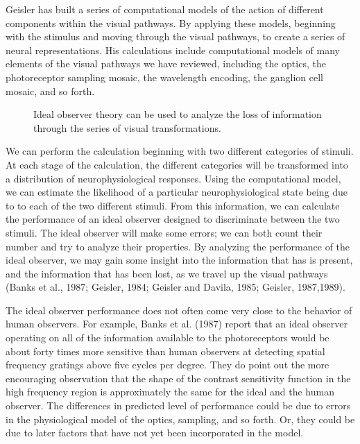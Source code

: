 Geisler has built a series of computational models
of the action of different components within the visual pathways.
By applying these models,
beginning with the stimulus
and moving through the
visual pathways,
to create a series of neural representations.
His calculations include computational
models of many elements of the visual pathways we have reviewed,
including the optics, the photoreceptor sampling mosaic,
the wavelength encoding, the ganglion cell mosaic, and so forth.
\begin{figure}
\centerline{
}
\caption[Ideal Observer Analysis of Behavior]{
Ideal observer theory can be used
to analyze the loss of information
through the series of visual transformations.
}
\label{f11:idealObserver}
\end{figure}

We can perform the calculation
beginning with two different categories of stimuli.
At each stage of the calculation,
the different categories will be transformed into
a distribution of neurophysiological responses.
Using the computational model, we can 
estimate the likelihood of a particular
neurophysiological state being due to
to each of the two different stimuli.
From this information,
we can calculate the performance of an ideal observer
designed to discriminate between the two stimuli.
The ideal observer will make some errors;
we can both count their number and try
to analyze their properties.
By analyzing the performance of the ideal observer,
we may gain some insight into the information that
has is present, and the information that
has been lost, as we travel up the visual pathways
(Banks et al., 1987;  Geisler, 1984; 
Geisler and Davila, 1985; Geisler, 1987,1989).

The ideal observer performance does not often
come very close to the behavior of human observers.
For example, Banks et al. (1987)
report that an ideal observer
operating on all of the information available
to the photoreceptors would be about forty times
more sensitive than human observers at detecting spatial
frequency gratings above five cycles per degree.
They do point out the more encouraging observation
that the shape of the contrast sensitivity
function in the high frequency region
is approximately the same for the ideal and the human observer.
The differences in predicted level of performance
could be due to errors in the physiological model of
the optics, sampling, and so forth.
Or, they could be due to later factors that have not
yet been incorporated in the model.

